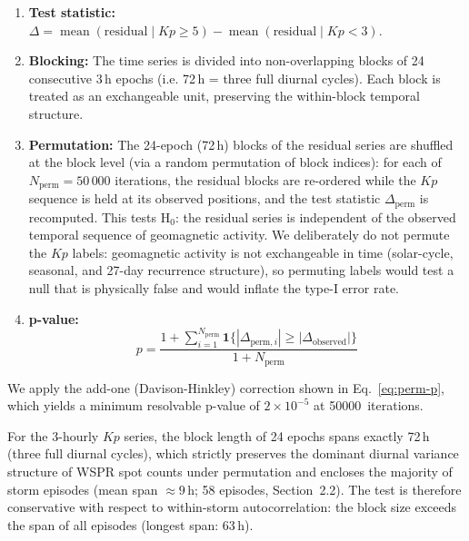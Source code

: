 \documentclass{agujournal2019}
\begin{document}
\begin{enumerate}
	\item \textbf{Test statistic:}
	      $\Delta = \operatorname{mean}(\text{residual} \mid Kp \ge 5)
		      - \operatorname{mean}(\text{residual} \mid Kp < 3)$.
	\item \textbf{Blocking:} The time series is divided into non-overlapping
	      blocks of 24 consecutive 3\,h epochs (i.e. 72\,h = three full
	      diurnal cycles). Each block is treated as an exchangeable unit,
	      preserving the within-block temporal structure.
	\item \textbf{Permutation:} The 24-epoch (72\,h) blocks of the residual
	      series are shuffled at the block level (via a random permutation
	      of block indices): for each of $N_{\text{perm}} = 50\,000$
	      iterations, the residual blocks are re-ordered while the $Kp$
	      sequence is held at its observed positions, and the test
	      statistic $\Delta_{\text{perm}}$ is recomputed. This tests
	      H$_0$: the residual series is independent of the observed
	      temporal sequence of geomagnetic activity. We deliberately do
	      not permute the $Kp$ labels: geomagnetic activity is not
	      exchangeable in time (solar-cycle, seasonal, and 27-day
	      recurrence structure), so permuting labels would test a null
	      that is physically false and would inflate the type-I error
	      rate.
	\item \textbf{p-value:}
	      \begin{equation}
		      p = \frac{1 + \sum_{i=1}^{N_{\text{perm}}}
			      \mathbf{1}\{ |\Delta_{\text{perm}, i}| \ge |\Delta_{\text{observed}}| \}}{1 + N_{\text{perm}}}
		      \label{eq:perm-p}
	      \end{equation}
\end{enumerate}

We apply the add-one (Davison-Hinkley) correction shown in
Eq.~\eqref{eq:perm-p}, which yields a minimum resolvable
p-value of $2 \times 10^{-5}$ at \SI{50000}{iterations}.

For the 3-hourly $Kp$ series, the block length of 24 epochs spans
exactly 72\,h (three full diurnal cycles), which strictly preserves the
dominant diurnal variance structure of WSPR spot counts under
permutation and encloses the majority of storm episodes (mean span
$\approx 9$\,h; 58 episodes, Section~2.2). The test is therefore
conservative with respect to within-storm autocorrelation: the block
size exceeds the span of all episodes (longest span: 63\,h).
\end{document}
